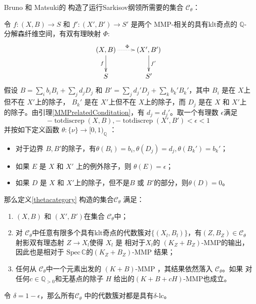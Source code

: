  Bruno 和 Matsuki的\cite[Lemma 3.6]{brunoLogSarkisovProgram1995} 构造了运行Sarkisov纲领所需要的集合 $\mathcal{C}_{\theta} $：
\begin{proposition}\label{cat}
  令 $ f:(X,B)\to S$ 和 $f':(X',B')\to S' $ 是两个 MMP-相关的具有klt奇点的 $ \mathbb{Q} $-分解森纤维空间，有双有理映射 $\Phi$:
  \[ \xymatrix{
      (X,B)\ar[d]_f\ar@{.>}[r]^\Phi&(X',B')\ar[d]^{f'}\\
      S&S'} \]
假设 $ B=\sum_ib_iB_i+\sum_jd_jD_j $ 和 $ B'=\sum_jd_j'D_j+\sum_kb_k'B_k' $，其中 $ B_{i} $ 是在 $ X $上但不在 $ X' $上的除子， $ B_k' $ 是在 $ X' $上但不在  $ X $上的除子，而 $ D_j $ 是在 $ X $ 和 $ X' $上的除子。由引理\ref{MMPrelatedConditation}，有 $ d_j=d_j' $。取一个有理数 $\epsilon$满足 
\[
  -\operatorname{totdiscrep}(X,B),-\operatorname{totdiscrep}(X',B')  <\epsilon <1 
\]
并按如下定义函数 $ \theta:\{\nu\}\to [0,1)_\mathbb{Q} $ ：
  \begin{itemize}
    \item 对于边界  $B,B'$的除子，有$ \theta(B_i)=b_i, \theta(D_j)=d_j,\theta(B_k')=b_k'$；
    \item  如果 $E$ 是 $X$ 和 $X'$ 上的例外除子，则    $ \theta(E)=\epsilon $；
    \item   如果 $ D $ 是 $ X $ 和 $ X' $上的除子，但不是$ B $ 或 $ B' $的部分，则$ \theta(D)=0 $。
  \end{itemize}
  那么定义\ref{thetacategory} 构造的集合$ \mathcal{C}_\theta $ 满足：
  \begin{enumerate}
    \item $ (X,B) $ 和 $ (X',B') $在集合 $ \mathcal{C}_\theta $中；
    \item   对 $ \mathcal{C}_\theta $中任意有限多个具有klt奇点的代数簇对$ \{(X_l,B_l)\} $，有$ (Z,B_Z)\in \mathcal{C}_\theta $ 射影双有理态射 $ Z\to X_l $使得 $X_{l}$ 是 相对于$X_{l}$的   $ (K_{Z}+B_{Z}) $-MMP的输出，因此也是相对于 $ \mathrm{Spec}\,\mathbb{C} $的$(K_Z+B_Z)$-MMP 结果；
    \item 任何从  $ \mathcal{C}_\theta $中一个元素出发的 $ (K+B) $-MMP ，其结果依然落入 $ \mathcal{C}_\theta $。如果 对任何$ c\in \mathbb{Q}_{>0} $和无基点的除子 $H$ 给出的$ (K+B+cH) $-MMP也成立。
  \end{enumerate}
\end{proposition}
\begin{remark}\label{delta-lc}
  令 $\delta=1-\epsilon$，那么所有$\mathcal{C}_{\theta}$ 中的代数簇对都是具有$\delta$-lc。
\end{remark}

